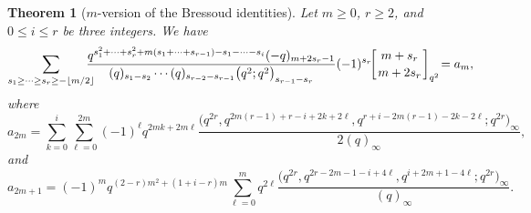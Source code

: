 \documentclass[pdftex]{sigma}
\numberwithin{equation}{section}
\newtheorem{Theorem}{Theorem}[section]
\begin{document}
\begin{Theorem}[$m$-version of the Bressoud identities]\label{thm:mb}
Let $m\geq 0$, $r \geq 2$, and $0 \leq i \leq r$ be three integers. We have
\begin{gather}
\sum_{s_1\geq\dots\geq s_{r}\geq-\left\lfloor m/2\right\rfloor}\!\!\!\!\!\frac{q^{s_1^2+\dots+s_{r}^2+m(s_1+\dots+s_{r-1})-s_1-\dots-s_{i}}({-}q)_{m+2s_r-1}}{(q)_{s_1-s_2}\cdots(q)_{s_{r-2} -s_{r-1}}\bigl(q^2;q^2\bigr)_{s_{r-1}-s_{r}}}(-1)^{s_r}\!\!\left[{m+s_r\atop m+2s_r}\right]_{q^2}\! =a_m,\!\!\!\!\label{mb}
\end{gather}
where
\begin{equation*}a_{2m}=\sum_{k=0}^{i}\sum_{\ell=0}^{2m}(-1)^\ell q^{2mk+2m\ell}\frac{\bigl(q^{2r},q^{2m(r-1)+r-i+2k+2\ell},q^{r+i-2m(r-1)-2k-2\ell};q^{2r}\bigr)_\infty}{2(q)_\infty},\end{equation*}
and
\begin{equation*}a_{2m+1}=(-1)^mq^{(2-r)m^2+(1+i-r)m}\sum_{\ell=0}^{m}q^{2\ell}\frac{\bigl(q^{2r},q^{2r-2m-1-i+4\ell},q^{i+2m+1-4\ell};q^{2r}\bigr)_\infty}{(q)_\infty}.
\end{equation*}
\end{Theorem}
\end{document}
